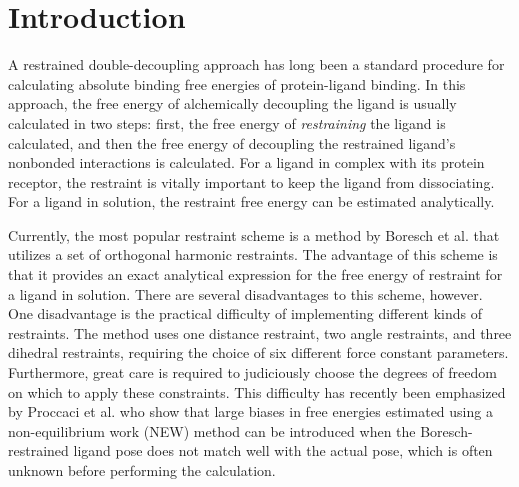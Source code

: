\documentclass[%
 aip,
 rsi,
 jmp,%
 amsmath,amssymb,
 reprint,%
]{revtex4-1}
\begin{document}
\maketitle


\section*{Introduction}

A restrained double-decoupling approach has long been a standard procedure for calculating absolute binding free energies of protein-ligand binding.  In this approach, the free energy of alchemically decoupling the ligand is usually calculated in two steps: first, the free energy of \textit{restraining} the ligand is calculated, and then the free energy of decoupling the restrained ligand's nonbonded interactions is calculated.     For a ligand in complex with its protein receptor, the restraint is vitally important to keep the ligand from dissociating.  For a ligand in solution, the restraint free energy can be estimated analytically. 

Currently, the most popular restraint scheme is a method by Boresch et al. \cite{boresch2003absolute} that utilizes a set of orthogonal harmonic restraints.  The advantage of this scheme is that it provides an exact analytical expression for the free energy of restraint for a ligand in solution.    There are several disadvantages to this scheme, however.  One disadvantage is the practical difficulty of implementing different kinds of restraints.  The method uses one distance restraint, two angle restraints, and three dihedral restraints, requiring the choice of six different force constant parameters.  Furthermore, great care is required to judiciously choose the degrees of freedom on which to apply these constraints.  This difficulty has recently been emphasized by Proccaci et al. \cite{procacci2021ns} who show that large biases in free energies estimated using a non-equilibrium work (NEW) method can be introduced when the Boresch-restrained ligand pose does not match well with the actual pose, which is often unknown before performing the calculation.
\end{document}
